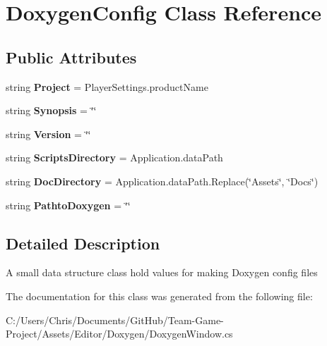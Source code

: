 \hypertarget{class_doxygen_config}{}\section{Doxygen\+Config Class Reference}
\label{class_doxygen_config}


 


\subsection*{Public Attributes}
\begin{DoxyCompactItemize}
\item 
string {\bfseries Project} = Player\+Settings.\+product\+Name\hypertarget{class_doxygen_config_ae69318495ba1db9f3a4d88e01764f9b4}{}\label{class_doxygen_config_ae69318495ba1db9f3a4d88e01764f9b4}

\item 
string {\bfseries Synopsis} = \char`\"{}\char`\"{}\hypertarget{class_doxygen_config_a2b1926144ba2768c36de32a8d3445567}{}\label{class_doxygen_config_a2b1926144ba2768c36de32a8d3445567}

\item 
string {\bfseries Version} = \char`\"{}\char`\"{}\hypertarget{class_doxygen_config_af72cbcc553de9766a100f77f90c35626}{}\label{class_doxygen_config_af72cbcc553de9766a100f77f90c35626}

\item 
string {\bfseries Scripts\+Directory} = Application.\+data\+Path\hypertarget{class_doxygen_config_aea53b2e7fc0f47a7f658ce25e65c4a09}{}\label{class_doxygen_config_aea53b2e7fc0f47a7f658ce25e65c4a09}

\item 
string {\bfseries Doc\+Directory} = Application.\+data\+Path.\+Replace(\char`\"{}Assets\char`\"{}, \char`\"{}Docs\char`\"{})\hypertarget{class_doxygen_config_aea9ba41fe61487effafbeb77120749f0}{}\label{class_doxygen_config_aea9ba41fe61487effafbeb77120749f0}

\item 
string {\bfseries Pathto\+Doxygen} = \char`\"{}\char`\"{}\hypertarget{class_doxygen_config_ad308ed1d0bdb202587fba232b754929f}{}\label{class_doxygen_config_ad308ed1d0bdb202587fba232b754929f}

\end{DoxyCompactItemize}


\subsection{Detailed Description}


A small data structure class hold values for making Doxygen config files 

The documentation for this class was generated from the following file\+:\begin{DoxyCompactItemize}
\item 
C\+:/\+Users/\+Chris/\+Documents/\+Git\+Hub/\+Team-\/\+Game-\/\+Project/\+Assets/\+Editor/\+Doxygen/Doxygen\+Window.\+cs\end{DoxyCompactItemize}

